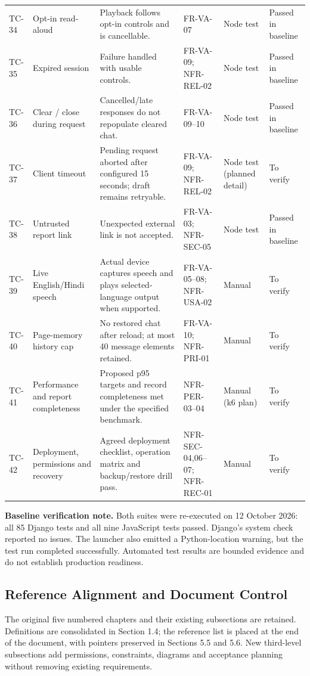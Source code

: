 \documentclass{article}
\newcommand{\BaselineDate}{12 October 2026}
\begin{document}
\begin{longtable}{@{}L{9mm}L{26mm}L{41mm}L{29mm}L{20mm}L{21mm}@{}}
TC-34 & Opt-in read-aloud & Playback follows opt-in controls and is cancellable. & FR-VA-07 & Node test & Passed in baseline\\
TC-35 & Expired session & Failure handled with usable controls. & FR-VA-09; NFR-REL-02 & Node test & Passed in baseline\\
TC-36 & Clear / close during request & Cancelled/late responses do not repopulate cleared chat. & FR-VA-09--10 & Node test & Passed in baseline\\
TC-37 & Client timeout & Pending request aborted after configured 15 seconds; draft remains retryable. & FR-VA-09; NFR-REL-02 & Node test (planned detail) & To verify\\
TC-38 & Untrusted report link & Unexpected external link is not accepted. & FR-VA-03; NFR-SEC-05 & Node test & Passed in baseline\\
TC-39 & Live English/Hindi speech & Actual device captures speech and plays selected-language output when supported. & FR-VA-05--08; NFR-USA-02 & Manual & To verify\\
TC-40 & Page-memory history cap & No restored chat after reload; at most 40 message elements retained. & FR-VA-10; NFR-PRI-01 & Manual & To verify\\
TC-41 & Performance and report completeness & Proposed p95 targets and record completeness met under the specified benchmark. & NFR-PER-03--04 & Manual (k6 plan) & To verify\\
TC-42 & Deployment, permissions and recovery & Agreed deployment checklist, operation matrix and backup/restore drill pass. & NFR-SEC-04,06--07; NFR-REC-01 & Manual & To verify\\
\end{longtable}\endgroup

\textbf{Baseline verification note.} Both suites were re-executed on \BaselineDate: all 85 Django tests and all nine JavaScript tests passed. Django's system check reported no issues. The launcher also emitted a Python-location warning, but the test run completed successfully. Automated test results are bounded evidence and do not establish production readiness.

\subsection{Reference Alignment and Document Control}
The original five numbered chapters and their existing subsections are retained. Definitions are consolidated in Section 1.4; the reference list is placed at the end of the document, with pointers preserved in Sections 5.5 and 5.6. New third-level subsections add permissions, constraints, diagrams and acceptance planning without removing existing requirements.
\end{document}
